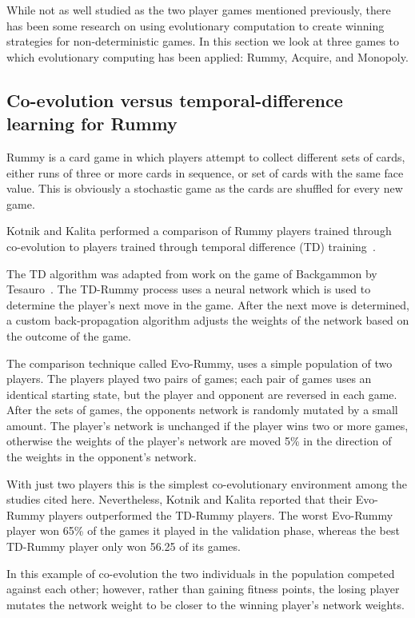 While not as well studied as the two player games mentioned previously, there
has been some research on using evolutionary computation to create winning
strategies for non-deterministic games. In this section we look at three games
to which evolutionary computing has been applied: Rummy, Acquire, and Monopoly.

\subsection{Co-evolution versus temporal-difference learning for Rummy}

Rummy is a card game in which players attempt to collect different sets of 
cards, either runs of three or more cards in sequence, or set of cards with the
same face value. This is obviously a stochastic game as the cards are shuffled
for every new game.

Kotnik and Kalita performed a comparison of Rummy players trained through 
co-evolution to players trained through temporal difference (TD) 
training~\cite{kotnik2003significance}.

The TD algorithm was adapted from work on the game of Backgammon by 
Tesauro~\cite{tesauro1992practical,tesauro1995temporal}. The TD-Rummy process
uses a neural network which is used to determine the player's next move in the
game. After the next move is determined, a custom back-propagation algorithm
adjusts the weights of the network based on the outcome of the game.

The comparison technique called Evo-Rummy, uses a simple population of two 
players. The players played two pairs of games; each pair of games uses an 
identical starting state, but the player and opponent are reversed in each 
game. After the sets of games, the opponents network is randomly mutated by
a small amount. The player's network is unchanged if the player wins two or
more games, otherwise the weights of the player's network are moved 5\% in
the direction of the weights in the opponent's network.

With just two players this is the simplest co-evolutionary environment among 
the studies cited here. Nevertheless, Kotnik and Kalita reported that their
Evo-Rummy players outperformed the TD-Rummy players. The worst Evo-Rummy player
won 65\% of the games it played in the validation phase, whereas the best 
TD-Rummy player only won 56.25\* of its games.

In this example of co-evolution the two individuals in the population competed
against each other; however, rather than gaining fitness points, the losing
player mutates the network weight to be closer to the winning player's network
weights.

